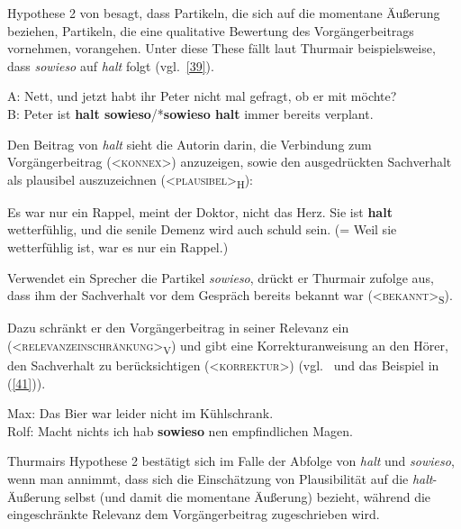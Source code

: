 Hypothese 2 von \citet{Thurmair1989} besagt, dass Partikeln, die sich auf die momentane Äußerung beziehen, Partikeln, die eine qualitative Bewertung des Vor\-gängerbeitrags vornehmen, vorangehen. Unter diese These fällt laut Thurmair beispielsweise, dass \textit{sowieso} auf \textit{halt} folgt (vgl.\ \ref{39}).

\begin{exe}
	\ex\label{39} 
	A: Nett, und jetzt habt ihr Peter nicht mal gefragt, ob er mit möchte?\\
	B: Peter ist \textbf{halt sowieso}/*\textbf{sowieso halt} immer bereits verplant.
\end{exe}
Den Beitrag von\textit{ halt} sieht die Autorin darin, die Verbindung zum Vorgängerbeitrag (<\textsc{konnex}>) anzuzeigen, sowie den ausgedrückten Sachverhalt als plausibel auszuzeichnen (<\textsc{plausibel}>\textsubscript{H}):

\begin{exe}
	\ex\label{40} 
			Es war nur ein Rappel, meint der Doktor, nicht das Herz. Sie ist \textbf{halt} wetterfühlig, und die senile Demenz 					wird auch schuld sein. (= Weil sie wetterfühlig ist, war es nur ein Rappel.)
			\hbox{}\hfill\hbox{\citet[125]{Thurmair1989}}	
\end{exe}
Verwendet ein Sprecher die Partikel \textit{sowieso}, drückt er Thurmair zufolge aus, dass ihm der Sachverhalt vor dem Gespräch bereits bekannt war (<\textsc{bekannt}>\textsubscript{S}). 

Dazu schränkt er den Vorgängerbeitrag in seiner Relevanz ein \linebreak (<\textsc{relevanzeinschränkung}>\textsubscript{V}) und gibt eine Korrekturanweisung an den Hörer, den Sachverhalt zu berücksichtigen (<\textsc{korrektur}>) (vgl.\ \citealt[136--137]{Thurmair1989} und das Beispiel in (\ref{41})).

\begin{exe}
	\ex\label{41} 
			Max: Das Bier war leider nicht im Kühlschrank.\\
			Rolf: Macht nichts ich hab \textbf{sowieso} nen empfindlichen Magen.
			\newline
			\hbox{}\hfill\hbox{\citet[138]{Thurmair1989}}	
\end{exe}
Thurmairs Hypothese 2 bestätigt sich im Falle der Abfolge von \textit{halt} und \textit{sowieso}, wenn man annimmt, dass sich die Einschätzung von Plausibilität auf die \textit{halt}-Äußerung selbst (und damit die momentane Äußerung) bezieht, während die eingeschränkte Relevanz dem Vorgängerbeitrag zugeschrieben wird.

